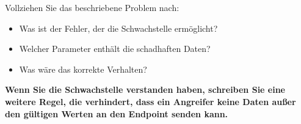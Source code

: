 Vollziehen Sie das beschriebene Problem nach:
\begin{itemize}
    \item Was ist der Fehler, der die Schwachstelle ermöglicht?
    \item Welcher Parameter enthält die schadhaften Daten?
    \item Was wäre das korrekte Verhalten?
\end{itemize}

\textbf{Wenn Sie die Schwachstelle verstanden haben, schreiben Sie eine weitere Regel, die verhindert, dass ein Angreifer keine Daten außer den gültigen Werten an den Endpoint senden kann.}

\pagebreak